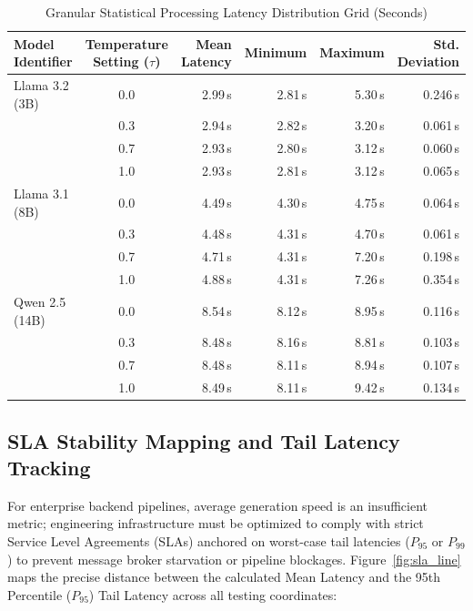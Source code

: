 \documentclass[11pt,journal,compsoc,onecolumn]{IEEEtran}
\begin{document}
\begin{table}[h]
\caption{Granular Statistical Processing Latency Distribution Grid (Seconds)}
\label{tab:latency_table}
\centering
\small
\begin{tabular}{lcrrrr}
\toprule
\textbf{Model Identifier} & \textbf{Temperature Setting ($\tau$)} & \textbf{Mean Latency} & \textbf{Minimum} & \textbf{Maximum} & \textbf{Std. Deviation} \\
\midrule
Llama 3.2 (3B)   & 0.0 & 2.99\,s & 2.81\,s & 5.30\,s & 0.246\,s \\
                 & 0.3 & 2.94\,s & 2.82\,s & 3.20\,s & 0.061\,s \\
                 & 0.7 & 2.93\,s & 2.80\,s & 3.12\,s & 0.060\,s \\
                 & 1.0 & 2.93\,s & 2.81\,s & 3.12\,s & 0.065\,s \\
\midrule
Llama 3.1 (8B)   & 0.0 & 4.49\,s & 4.30\,s & 4.75\,s & 0.064\,s \\
                 & 0.3 & 4.48\,s & 4.31\,s & 4.70\,s & 0.061\,s \\
                 & 0.7 & 4.71\,s & 4.31\,s & 7.20\,s & 0.198\,s \\
                 & 1.0 & 4.88\,s & 4.31\,s & 7.26\,s & 0.354\,s \\
\midrule
Qwen 2.5 (14B)   & 0.0 & 8.54\,s & 8.12\,s & 8.95\,s & 0.116\,s \\
                 & 0.3 & 8.48\,s & 8.16\,s & 8.81\,s & 0.103\,s \\
                 & 0.7 & 8.48\,s & 8.11\,s & 8.94\,s & 0.107\,s \\
                 & 1.0 & 8.49\,s & 8.11\,s & 9.42\,s & 0.134\,s \\
\bottomrule
\end{tabular}
\end{table}

\subsection{SLA Stability Mapping and Tail Latency Tracking}
For enterprise backend pipelines, average generation speed is an insufficient metric; engineering infrastructure must be optimized to comply with strict Service Level Agreements (SLAs) anchored on worst-case tail latencies ($P_{95}$ or $P_{99}$) to prevent message broker starvation or pipeline blockages. Figure~\ref{fig:sla_line} maps the precise distance between the calculated Mean Latency and the 95th Percentile ($P_{95}$) Tail Latency across all testing coordinates:
\end{document}
